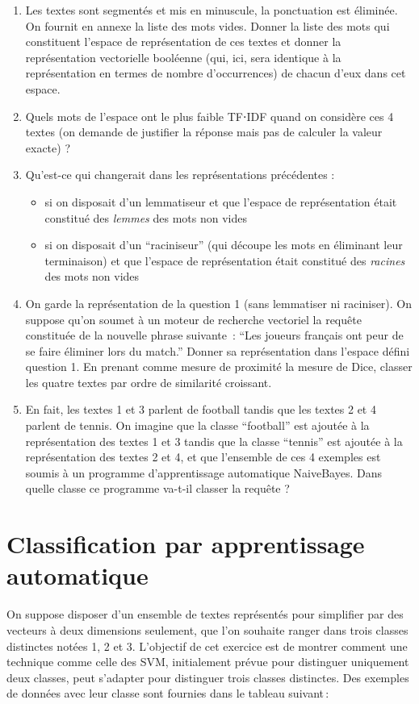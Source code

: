 \documentclass[a4paper, 11pt]{article}
\begin{document}
\begin{enumerate}
	\item Les textes sont segmentés et mis en minuscule, la ponctuation est éliminée. On fournit en
		annexe la liste des mots vides. Donner la liste des mots qui constituent l'espace de
		représentation de ces textes et donner la représentation vectorielle booléenne (qui, ici, sera
		identique à la représentation en termes de nombre d'occurrences) de chacun d'eux dans cet
		espace.
	\item Quels mots de l'espace ont le plus faible TF⋅IDF quand on considère ces 4 textes (on demande
		de justifier la réponse mais pas de calculer la valeur exacte) ?
	\item Qu'est-ce qui changerait dans les représentations précédentes :
		\begin{itemize}
		\item si on disposait d'un lemmatiseur et que l'espace de représentation était constitué des
			\emph{lemmes} des mots non vides
		\item si on disposait d'un ``raciniseur'' (qui découpe les mots en éliminant leur terminaison)
			et que l'espace de représentation était constitué des \emph{racines} des mots non vides
		\end{itemize}
	\item On garde la représentation de la question 1 (sans lemmatiser ni raciniser). On suppose qu'on
		soumet à un moteur de recherche vectoriel la requête constituée de la nouvelle phrase suivante :
		\enquote{Les joueurs français ont peur de se faire éliminer lors du match.} Donner sa
		représentation dans l'espace défini question 1. En prenant comme mesure de proximité la mesure
		de Dice, classer les quatre textes par ordre de similarité croissant.
	\item En fait, les textes 1 et 3 parlent de football tandis que les textes 2 et 4 parlent de
		tennis. On imagine que la classe \enquote{football} est ajoutée à la représentation des textes 1
		et 3 tandis que la classe \enquote{tennis} est ajoutée à la représentation des textes 2 et 4, et
		que l'ensemble de ces 4 exemples est soumis à un programme d'apprentissage automatique
		NaiveBayes. Dans quelle classe ce programme va-t-il classer la requête ?
\end{enumerate}

\section{Classification par apprentissage automatique}
On suppose disposer d'un ensemble de textes représentés pour simplifier par des vecteurs à deux
dimensions seulement, que l'on souhaite ranger dans trois classes distinctes notées 1, 2 et 3.
L'objectif de cet exercice est de montrer comment une technique comme celle des SVM, initialement
prévue pour distinguer uniquement deux classes, peut s'adapter pour distinguer trois classes
distinctes. Des exemples de données avec leur classe sont fournies dans le tableau suivant :
\end{document}
